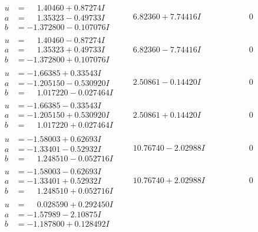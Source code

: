 \documentclass[1p]{elsarticle_modified}
\theoremstyle{definition}
\begin{document}
$$\begin{array}{c|c|c}
\begin{aligned}
u &= \phantom{-}1.40460 + 0.87274 I \\
a &= \phantom{-}1.35323 - 0.49733 I \\
b &= -1.372800 - 0.107076 I\end{aligned}
 & \phantom{-}6.82360 + 7.74416 I & \phantom{-0.000000 } 0 \\ \hline\begin{aligned}
u &= \phantom{-}1.40460 - 0.87274 I \\
a &= \phantom{-}1.35323 + 0.49733 I \\
b &= -1.372800 + 0.107076 I\end{aligned}
 & \phantom{-}6.82360 - 7.74416 I & \phantom{-0.000000 } 0 \\ \hline\begin{aligned}
u &= -1.66385 + 0.33543 I \\
a &= -1.205150 - 0.530920 I \\
b &= \phantom{-}1.017220 - 0.027464 I\end{aligned}
 & \phantom{-}2.50861 - 0.14420 I & \phantom{-0.000000 } 0 \\ \hline\begin{aligned}
u &= -1.66385 - 0.33543 I \\
a &= -1.205150 + 0.530920 I \\
b &= \phantom{-}1.017220 + 0.027464 I\end{aligned}
 & \phantom{-}2.50861 + 0.14420 I & \phantom{-0.000000 } 0 \\ \hline\begin{aligned}
u &= -1.58003 + 0.62693 I \\
a &= -1.33401 - 0.52932 I \\
b &= \phantom{-}1.248510 - 0.052716 I\end{aligned}
 & \phantom{-}10.76740 - 2.02988 I & \phantom{-0.000000 } 0 \\ \hline\begin{aligned}
u &= -1.58003 - 0.62693 I \\
a &= -1.33401 + 0.52932 I \\
b &= \phantom{-}1.248510 + 0.052716 I\end{aligned}
 & \phantom{-}10.76740 + 2.02988 I & \phantom{-0.000000 } 0 \\ \hline\begin{aligned}
u &= \phantom{-}0.028590 + 0.292450 I \\
a &= -1.57989 - 2.10875 I \\
b &= -1.187800 + 0.128492 I\end{aligned}

\end{array}$$
\end{document}
